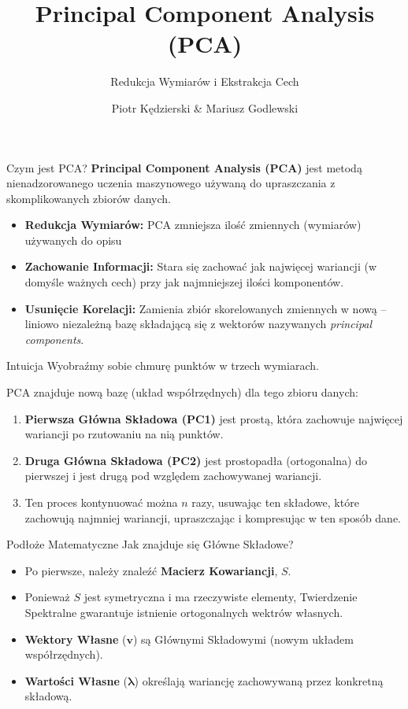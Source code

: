 \documentclass{beamer}
\title{Principal Component Analysis (PCA)}
\subtitle{Redukcja Wymiarów i Ekstrakcja Cech}
\author{Piotr Kędzierski \& Mariusz Godlewski}
\date{}
\begin{document}
	
	
	\begin{frame}
		\titlepage
	\end{frame}
	
	
	\begin{frame}{Czym jest PCA?}
		\textbf{Principal Component Analysis (PCA)} jest metodą nienadzorowanego uczenia maszynowego używaną do upraszczania z skomplikowanych zbiorów danych.
		
		\vspace{0.5cm}
		\begin{itemize}
			\item \textbf{Redukcja Wymiarów:} PCA zmniejsza ilość zmiennych (wymiarów) używanych do opisu 
			\item \textbf{Zachowanie Informacji:} Stara się zachować jak najwięcej wariancji (w domyśle ważnych cech) przy jak najmniejszej ilości komponentów.
			\item \textbf{Usunięcie Korelacji:} Zamienia zbiór skorelowanych zmiennych w nową -- liniowo niezależną bazę składającą się z wektorów nazywanych \textit{principal components}.
		\end{itemize}
	\end{frame}
	
	
	\begin{frame}{Intuicja}
		Wyobraźmy sobie chmurę punktów w trzech wymiarach.
		
		\vspace{0.5cm}
		PCA znajduje nową bazę (układ współrzędnych) dla tego zbioru danych:
		\begin{enumerate}
			\item\textbf{Pierwsza Główna Składowa (PC1)} jest prostą, która zachowuje najwięcej wariancji po rzutowaniu na nią punktów.
			\item\textbf{Druga Główna Składowa (PC2)} jest prostopadła (ortogonalna) do pierwszej i jest drugą pod względem zachowywanej wariancji.
			\item Ten proces kontynuować można $n$ razy, usuwając ten składowe, które zachowują najmniej wariancji, upraszczając i kompresując w ten sposób dane.
		\end{enumerate}
	\end{frame}
	
	
	\begin{frame}{Podłoże Matematyczne}
		Jak znajduje się Główne Składowe?
		
		\vspace{0.5cm}
		\begin{itemize}
			\item Po pierwsze, należy znaleźć \textbf{Macierz Kowariancji}, $S$.
			\item Ponieważ $S$ jest symetryczna i ma rzeczywiste elementy, Twierdzenie Spektralne gwarantuje istnienie ortogonalnych wektrów własnych.
			\item\textbf{Wektory Własne} ($\mathbf{v}$) są Głównymi Składowymi (nowym układem współrzędnych).
			\item\textbf{Wartości Własne} ($\mathbf{\lambda}$) określają wariancję zachowywaną przez konkretną składową.
		\end{itemize}
	\end{frame}
	
\end{document}
